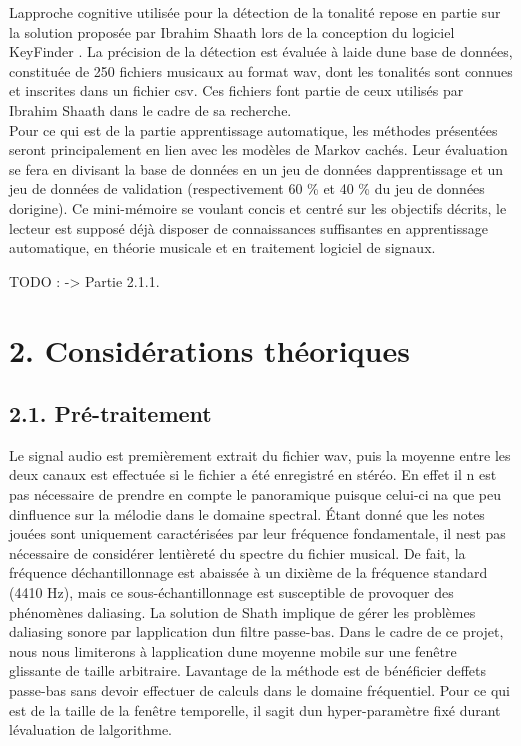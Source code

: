 \documentclass[letterpaper]{article}
\begin{document}
L\textquotesingle approche cognitive utilisée pour la détection de la tonalité repose en partie
sur la solution proposée par Ibrahim Sha\textquotesingle ath lors 
de la conception du logiciel KeyFinder \citep{IS}. La précision de la détection est évaluée 
à l\textquotesingle aide d\textquotesingle une base 
de données, constituée de 250 fichiers musicaux au format wav, dont les tonalités sont connues
et inscrites dans un fichier csv. Ces fichiers font partie de ceux utilisés par 
Ibrahim Sha\textquotesingle ath dans le cadre de sa recherche.\\

Pour ce qui est de la partie apprentissage automatique, les méthodes présentées seront principalement
en lien avec les modèles de Markov cachés. Leur évaluation se fera en divisant la base de données en
un jeu de données d\textquotesingle apprentissage et un jeu de données de validation (respectivement
60 \% et 40 \% du jeu de données d\textquotesingle origine). Ce mini-mémoire se voulant concis et 
centré sur les objectifs décrits, le lecteur est supposé déjà disposer de connaissances suffisantes en 
apprentissage automatique, en théorie musicale et en traitement logiciel de signaux.

TODO : \citep{SP} \citep{AT} -> Partie 2.1.1.

\section*{2. Considérations théoriques}

\subsection*{2.1. Pré-traitement}

Le signal audio est premièrement extrait du fichier wav, puis la moyenne entre les 
deux canaux est effectuée si le fichier a été enregistré en stéréo. En effet il n\textquotesingle
est pas nécessaire de prendre en compte le panoramique puisque celui-ci n\textquotesingle a que 
peu d\textquotesingle influence sur la mélodie dans le domaine spectral. 
Étant donné que les notes jouées sont uniquement caractérisées par leur fréquence fondamentale,
il n\textquotesingle est pas nécessaire de considérer l\textquotesingle entièreté du spectre
du fichier musical. De fait, la fréquence d\textquotesingle échantillonnage est abaissée à un dixième 
de la fréquence standard (4410 Hz), mais ce sous-échantillonnage est susceptible de provoquer des
phénomènes d\textquotesingle aliasing. La solution de Sh\textquotesingle ath implique de
gérer les problèmes d\textquotesingle aliasing sonore par l\textquotesingle application 
d\textquotesingle un filtre passe-bas. Dans le cadre de ce projet, nous nous limiterons à
l\textquotesingle application d\textquotesingle une moyenne mobile sur une fenêtre glissante
de taille arbitraire. L\textquotesingle avantage de la méthode est de bénéficier d\textquotesingle effets
passe-bas sans devoir effectuer de calculs dans le domaine fréquentiel. Pour ce qui est de la taille
de la fenêtre temporelle, il s\textquotesingle agit d\textquotesingle un hyper-paramètre fixé durant
l\textquotesingle évaluation de l\textquotesingle algorithme. \citep{IS}
\end{document}
